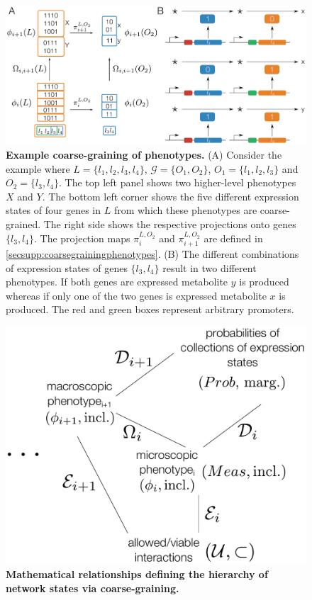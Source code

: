 \begin{figure}[!ht]
\centering
\noindent\includegraphics[width=0.9\columnwidth]{fig/phenotypehierarchy.pdf}
\caption{{\bf Example coarse-graining of phenotypes.} (A) Consider the example where $L = \{l_1,l_2,l_3,l_4\}$, $\mathcal{G} = \{ O_1, O_2 \}$, $O_1 = \{l_1, l_2, l_3\}$ and $O_2 = \{ l_3, l_4 \}$. The top left panel shows two higher-level phenotypes $X$ and $Y$. The bottom left corner shows the five different expression states of four genes in $L$ from which these phenotypes are coarse-grained. The right side shows the respective projections onto genes $\{l_3,l_4\}$. The projection maps $\pi_i^{L,O_2}$ and $\pi_{i+1}^{L,O_2}$ are defined in  \autoref{secsupp:coarsegrainingphenotypes}. (B) The different combinations of expression states of genes $\{l_3,l_4\}$ result in two different phenotypes. If both genes are expressed metabolite $y$ is produced whereas if only one of the two genes is expressed metabolite $x$ is produced. The red and green boxes represent arbitrary promoters.}
\label{fig:phenotypehierarchy}
\end{figure}

\pagebreak

\begin{figure}[!ht]
\centering
\noindent\includegraphics[width=0.4\columnwidth]{fig/abstractroadmap.pdf}
\caption{{\bf Mathematical relationships defining the hierarchy of network states via coarse-graining.} }
\label{fig:abstractroadmap}
\end{figure}

\pagebreak

